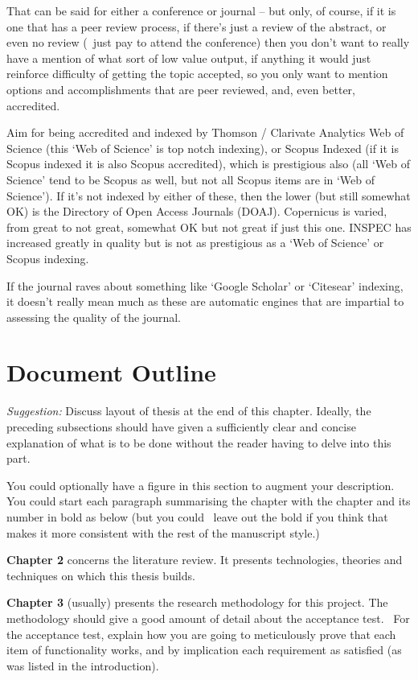 That can be said for either a conference or journal -- but only, of course, if it is one that has a peer review process, if there's just a review of the abstract, or even no review (\ie~just pay to attend the conference) then you don't want to really have a mention of what sort of low value output, if anything it would just reinforce difficulty of getting the topic accepted, so you only want to mention options and accomplishments that are peer reviewed, and, even better, accredited.

Aim for being accredited and indexed by Thomson / Clarivate Analytics Web of Science (this `Web of Science' is top notch indexing), or Scopus Indexed (if it is Scopus indexed it is also Scopus accredited), which is prestigious also (all `Web of Science' tend to be Scopus as well, but not all Scopus items are in `Web of Science').  If it's not indexed by either of these, then the lower (but still somewhat OK) is the Directory of Open Access Journals (DOAJ). Copernicus is varied, from great to not great, somewhat OK but not great if just this one. INSPEC has increased greatly in quality but is not as prestigious as a `Web of Science' or Scopus indexing.

If the journal raves about something like `Google Scholar' or `Citesear' indexing, it doesn't really mean much as these are automatic engines that are impartial to assessing the quality of the journal.

\section{Document Outline}

\emph{Suggestion:} Discuss layout of thesis at the end of this chapter.  Ideally, the preceding subsections should have given a sufficiently clear and concise explanation of what is to be done without the reader having to delve into this part.

You could optionally have a figure in this section to augment your description. You could start each paragraph summarising the chapter with the chapter and its number in bold as below (but you could \eg~leave out the bold if you think that makes it more consistent with the rest of the manuscript style.)

\textbf{Chapter 2} concerns the literature review. It presents technologies, theories and techniques on which this thesis builds.

\textbf{Chapter 3} (usually) presents the research methodology for this project. The methodology should give a good amount of detail about the acceptance test. \ie~For the acceptance test, explain how you are going to meticulously prove that each item of functionality works, and by implication each requirement as satisfied (as was listed in the introduction).

